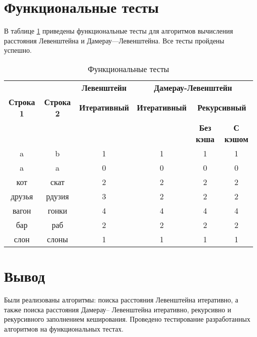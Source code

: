 \clearpage

\section{Функциональные тесты}

В таблице \ref{tbl:func_tests} приведены функциональные тесты для алгоритмов вычисления расстояния Левенштейна и Дамерау—Левенштейна. Все тесты пройдены успешно.

\begin{table}[ht]
	\small
	\begin{center}
		\caption{Функциональные тесты}
		\label{tbl:func_tests}
		\begin{tabular}{|c|c|c|c|c|c|}
			\hline
			&
			& \multicolumn{1}{c|}{\bfseries Левенштейн}
			& \multicolumn{3}{c|}{\bfseries Дамерау-Левенштейн} \\ \cline{3-6}
			
			\bfseries Строка 1 & \bfseries Строка 2 & \bfseries Итеративный & \bfseries Итеративный
			
			& \multicolumn{2}{c|}{\bfseries Рекурсивный} \\ \cline{5-6}
			& & & & \bfseries Без кэша & \bfseries С кэшом \\
			\hline
			a & b & 1 & 1 & 1 & 1 \\
			\hline
			a & a & 0 & 0 & 0 & 0 \\
			\hline
			кот & скат & 2 & 2 & 2 & 2 \\
			\hline
			друзья & рдузия & 3 & 2 & 2 & 2 \\
			\hline
			вагон & гонки & 4 & 4 & 4 & 4 \\
			\hline
			бар & раб & 2 & 2 & 2 & 2 \\
			\hline
			слон & слоны & 1 & 1 & 1 & 1 \\
			\hline
		\end{tabular}
	\end{center}
\end{table}

\section*{Вывод}

Были реализованы алгоритмы: поиска расстояния Левенштейна
итеративно, а также поиска расстояния Дамерау–
Левенштейна итеративно, рекурсивно и рекурсивного заполнением кеширования. Проведено тестирование разработанных алгоритмов на функциональных тестах.
